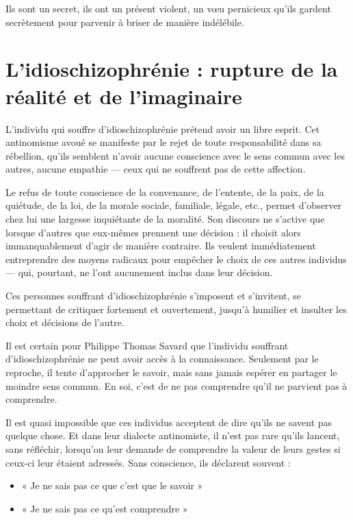 \documentclass[12pt,oneside]{article}
\begin{document}
Ils sont un secret, ils ont un présent violent, un vœu pernicieux qu'ils gardent secrètement pour parvenir à briser de manière indélébile.

\section{L'idioschizophrénie : rupture de la réalité et de l'imaginaire}

L'individu qui souffre d'idioschizophrénie prétend avoir un libre esprit. Cet antinomisme avoué se manifeste par le rejet de toute responsabilité dans sa rébellion, qu'ils semblent n'avoir aucune conscience avec le sens commun avec les autres, aucune empathie --- ceux qui ne souffrent pas de cette affection.

Le refus de toute conscience de la convenance, de l'entente, de la paix, de la quiétude, de la loi, de la morale sociale, familiale, légale, etc., permet d'observer chez lui une largesse inquiétante de la moralité. Son discours ne s'active que lorsque d'autres que eux-mêmes prennent une décision : il choisit alors immanquablement d'agir de manière contraire. Ils veulent immédiatement entreprendre des moyens radicaux pour empêcher le choix de ces autres individus --- qui, pourtant, ne l'ont aucunement inclus dans leur décision.

Ces personnes souffrant d'idioschizophrénie s'imposent et s'invitent, se permettant de critiquer fortement et ouvertement, jusqu'à humilier et insulter les choix et décisions de l'autre.

Il est certain pour Philippe Thomas Savard que l'individu souffrant d'idioschizophrénie ne peut avoir accès à la connaissance. Seulement par le reproche, il tente d'approcher le savoir, mais sans jamais espérer en partager le moindre sens commun. En soi, c'est de ne pas comprendre qu'il ne parvient pas à comprendre.

Il est quasi impossible que ces individus acceptent de dire qu'ils ne savent pas quelque chose. Et dans leur dialecte antinomiste, il n'est pas rare qu'ils lancent, sans réfléchir, lorsqu'on leur demande de comprendre la valeur de leurs gestes si ceux-ci leur étaient adressés. Sans conscience, ils déclarent souvent :

\begin{itemize}
    \item « Je ne sais pas ce que c'est que le savoir »
    \item « Je ne sais pas ce qu'est comprendre »
\end{itemize}
\end{document}

